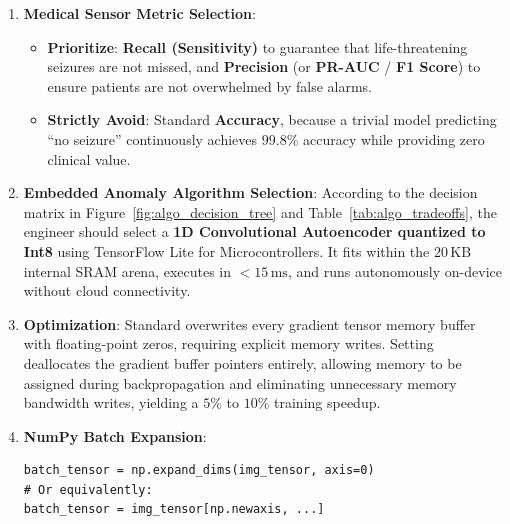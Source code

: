\begin{enumerate}
    \item \textbf{Medical Sensor Metric Selection}:
    \begin{itemize}
        \item \textbf{Prioritize}: \textbf{Recall (Sensitivity)} to guarantee that life-threatening seizures are not missed, and \textbf{Precision} (or \textbf{PR-AUC} / \textbf{F1 Score}) to ensure patients are not overwhelmed by false alarms.
        \item \textbf{Strictly Avoid}: Standard \textbf{Accuracy}, because a trivial model predicting ``no seizure'' continuously achieves $99.8\%$ accuracy while providing zero clinical value.
    \end{itemize}

    \item \textbf{Embedded Anomaly Algorithm Selection}:
    According to the decision matrix in Figure~\ref{fig:algo_decision_tree} and Table~\ref{tab:algo_tradeoffs}, the engineer should select a \textbf{1D Convolutional Autoencoder quantized to Int8} using TensorFlow Lite for Microcontrollers. It fits within the $20\,\text{KB}$ internal SRAM arena, executes in $< 15\,\text{ms}$, and runs autonomously on-device without cloud connectivity.

    \item \textbf{ Optimization}:
    Standard  overwrites every gradient tensor memory buffer with floating-point zeros, requiring explicit memory writes. Setting  deallocates the gradient buffer pointers entirely, allowing memory to be assigned during backpropagation and eliminating unnecessary memory bandwidth writes, yielding a $5\%$ to $10\%$ training speedup.

    \item \textbf{NumPy Batch Expansion}:
    \begin{lstlisting}[style=pythonstyle]
batch_tensor = np.expand_dims(img_tensor, axis=0)
# Or equivalently:
batch_tensor = img_tensor[np.newaxis, ...]
    \end{lstlisting}
\end{enumerate}

